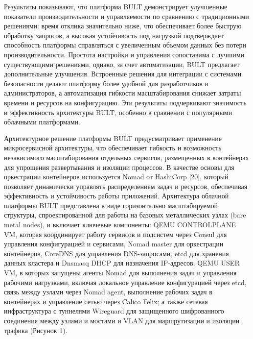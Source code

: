 \begin{multicols}{2}
Результаты показывают, что платформа BULT демонстрирует улучшенные
показатели производительности и управляемости по сравнению с
традиционными решениями: время отклика значительно ниже, что
обеспечивает более быструю обработку запросов, а высокая устойчивость
под нагрузкой подтверждает способность платформы справляться с
увеличенным объемом данных без потери производительности. Простота
настройки и управления сопоставима с лучшими существующими решениями,
однако, за счет автоматизации, BULT предлагает дополнительные улучшения.
Встроенные решения для интеграции с системами безопасности делают
платформу более удобной для разработчиков и администраторов, а
автоматизация гибкости масштабирования снижает затраты времени и
ресурсов на конфигурацию. Эти результаты подчеркивают значимость и
эффективность архитектуры BULT, особенно в сравнении с популярными
облачными платформами.

Архитектурное решение платформы BULT предусматривает применение
микросервисной архитектуры, что обеспечивает гибкость и возможность
независимого масштабирования отдельных сервисов, размещенных в
контейнерах для упрощения развертывания и изоляции процессов. В качестве
основы для оркестрации контейнеров используется Nomad от HashiCorp
{[}20{]}, который позволяет динамически управлять распределением задач и
ресурсов, обеспечивая эффективность и устойчивость работы приложений.
Архитектура облачной платформы BULT представлена в виде горизонтально
масштабируемой структуры, спроектированной для работы на базовых
металлических узлах (bare metal nodes), и включает ключевые компоненты:
QEMU CONTROLPLANE VM, которая координирует работу сервисов и подсистем
через Consul для управления конфигурацией и сервисами, Nomad master для
оркестрации контейнеров, CoreDNS для управления DNS-запросами, etcd для
хранения данных кластера и Dnsmasq DHCP для назначения IP-адресов; QEMU
USER VM, в которых запущены агенты Nomad для выполнения задач и
управления рабочими нагрузками, включая локальное управление
конфигурацией через etcd, связь между узлами через Nomad agent,
выполнение рабочих задач в контейнерах и управление сетью через Calico
Felix; а также сетевая инфраструктура с туннелями Wireguard для
защищенного шифрованного соединения между узлами и мостами и VLAN для
маршрутизации и изоляции трафика (Рисунок 1).


\end{multicols}
